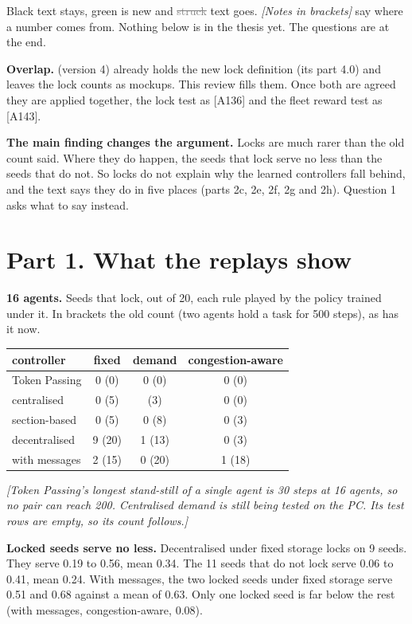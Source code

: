 \documentclass[11pt,a4paper]{article}
\newcommand{\new}[1]{\textcolor{newc}{#1}}
\newcommand{\old}[1]{\textcolor{gray}{\sout{#1}}}
\newcommand{\note}[1]{{\small\itshape [#1]}}
\newcommand{\lab}[1]{\textsf{\footnotesize\detokenize{#1}}}
\newcommand{\mockup}[1]{\fbox{\small mockup: #1}}
\begin{document}
Black text stays, \new{green} is new and \old{struck} text goes.
\note{Notes in brackets} say where a number comes from. Nothing below is in
the thesis yet. The questions are at the end.

\textbf{Overlap.} \lab{review_locks_fleet_reward} (version 4) already holds
the new lock definition (its part 4.0) and leaves the lock counts as
mockups. This review fills them. Once both are agreed they are applied
together, the lock test as [A136] and the fleet reward test as [A143].

\textbf{The main finding changes the argument.} Locks are much rarer than
the old count said. Where they do happen, the seeds that lock serve no less
than the seeds that do not. So locks do not explain why the learned
controllers fall behind, and the text says they do in five places (parts 2c,
2e, 2f, 2g and 2h). Question 1 asks what to say instead.

\section*{Part 1. What the replays show}

\textbf{16 agents.} Seeds that lock, out of 20, each rule played by the
policy trained under it. In brackets the old count (two agents hold a task
for 500 steps), as \lab{tab:exp:locks} has it now.

\begin{center}\small
\begin{tabular}{l ccc}
  \toprule
  controller & fixed & demand & congestion-aware \\
  \midrule
  Token Passing & 0 (0) & 0 (0) & 0 (0) \\
  centralised   & 0 (5) & \mockup{eval-pc} (3) & 0 (0) \\
  section-based & 0 (5) & 0 (8) & 0 (3) \\
  decentralised & 9 (20) & 1 (13) & 0 (3) \\
  with messages & 2 (15) & 0 (20) & 1 (18) \\
  \bottomrule
\end{tabular}
\end{center}

\note{Token Passing's longest stand-still of a single agent is 30 steps at 16
agents, so no pair can reach 200. Centralised demand is still being tested
on the PC. Its test rows are empty, so its count follows.}

\textbf{Locked seeds serve no less.} Decentralised under fixed storage locks
on 9 seeds. They serve 0.19 to 0.56, mean 0.34. The 11 seeds that do not lock
serve 0.06 to 0.41, mean 0.24. With messages, the two locked seeds under fixed
storage serve 0.51 and 0.68 against a mean of 0.63. Only one locked seed is
far below the rest (with messages, congestion-aware, 0.08).
\end{document}
